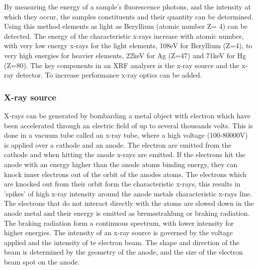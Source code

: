By measuring the energy of a sample's fluorescence photons, and the intensity at which they occur, the samples constituents and their quantity can be determined. Using this method elements as light as Beryllium (atomic number Z= 4) can be detected. The energy of the characteristic x-rays increase with atomic number, with very low energy x-rays for the light elements, 108eV for Beryllium (Z=4), to very high energies for heavier elements, 22keV for Ag (Z=47) and 71keV for Hg (Z=80).
The key components in an XRF analyser is the x-ray source and the x-ray detector. To increase performance x-ray optics can be added.

\subsubsection{X-ray source}
X-rays can be generated by bombarding a metal object with electron which have been accelerated through an electric field of up to several thousands volts. This is done in a vacuum tube called an x-ray tube, where a high voltage (100-80000V) is applied over a cathode and an anode. The electron are emitted from the cathode and when hitting the anode x-rays are emitted. If the electrons hit the anode with an energy higher than the anode atoms binding energy, they can knock inner electrons out of the orbit of the anodes atoms. The electrons which are knocked out from their orbit form the characteristic x-rays, this results in 'spikes' of high x-ray intensity around the anode metals characteristic x-rays line.
The electrons that do not interact directly with the atoms are slowed down in the anode metal and their energy is emitted as bremsstrahlung or braking radiation. The braking radiation form a continuous spectrum, with lower intensity for higher energies.
The intensity of an x-ray source is governed by the voltage applied and the intensity of te electron beam. The shape and direction of the beam is determined by the geometry of the anode, and the size of the electron beam spot on the anode.


